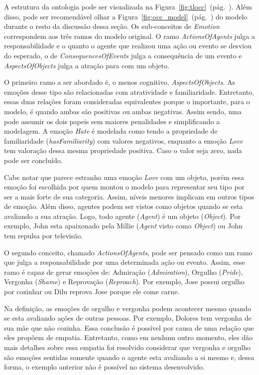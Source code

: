 A estrutura da ontologia pode ser visualizada na
Figura~\ref{fig:tlocc}~(pág.~\pageref{fig:tlocc}). Além disso, pode ser
recomendável olhar a
Figura~\ref{fig:occ_model}~(pág.~\pageref{fig:occ_model}) do modelo \occ
durante o resto da discussão dessa seção. Os sub-conceitos de \emph{Emotion}
correspondem aos três ramos do modelo original.
O ramo \emph{ActionsOfAgents} julga a responsabilidade e o quanto o agente que
realizou uma ação ou evento se desviou do esperado, o de
\emph{ConsequencesOfEvents} julga a consequência de um evento e
\emph{AspectsOfObjects} julga a atração para com um objeto.

O primeiro ramo a ser abordado é, o menos cognitivo, \emph{AspectsOfObjects}.
As emoções desse tipo são relacionadas com atratividade e familiaridade.
Entretanto, essas duas relações foram consideradas equivalentes porque o
importante, para o modelo, é quando ambas são positivas ou ambas negativas.
Assim sendo, uma pode assumir os dois papeis sem maiores penalidades e
simplificando a modelagem. A emoção \emph{Hate} é modelada como tendo a
propriedade de familiaridade (\emph{hasFamiliarity}) com valores negativos,
enquanto a emoção \emph{Love} tem valoração dessa mesma propriedade positiva.
Caso o valor seja zero, nada pode ser concluído.

Cabe notar que parece estranho uma emoção \emph{Love} com um objeto, porém
essa emoção foi escolhida por quem montou o modelo para representar seu tipo
por ser a mais forte de sua categoria. Assim, níveis menores implicam em
outros tipos de emoção. Além disso, agentes
podem ser vistos como objetos quando se esta avaliando a sua atração. Logo,
todo agente (\emph{Agent}) é um objeto (\emph{Object}). Por exemplo, John esta
apaixonado pela Millie (\emph{Agent} visto como \emph{Object}) ou John tem
repulsa por televisão.

O segundo conceito, chamado \emph{ActionsOfAgents}, pode ser pensado como
um ramo que julga a responsabilidade por uma determinada ação ou evento.
Assim, esse ramo é capaz de gerar emoções de: Admiração (\emph{Admiration}),
Orgulho (\emph{Pride}), Vergonha (\emph{Shame}) e Reprovação
(\emph{Reproach}). Por exemplo, Jose possui orgulho por cozinhar ou Dilu
reprova Jose porque ele come carne.

Na definição, as emoções de orgulho e vergonha podem acontecer mesmo quando se
esta avaliando ações de outras pessoas. Por exemplo, Dolores tem vergonha de
sua mãe que não cozinha. Essa conclusão é possível por causa de uma relação
que eles propõem de empatia\label{mark:empat}. Entretanto, como em nenhum outro momento, eles
dão mais detalhes sobre essa empatia foi resolvido considerar que vergonha e
orgulho são emoções sentidas somente quando o agente esta avaliando a si mesmo
e, dessa forma, o exemplo anterior não é possível no sistema desenvolvido. \dev{}

